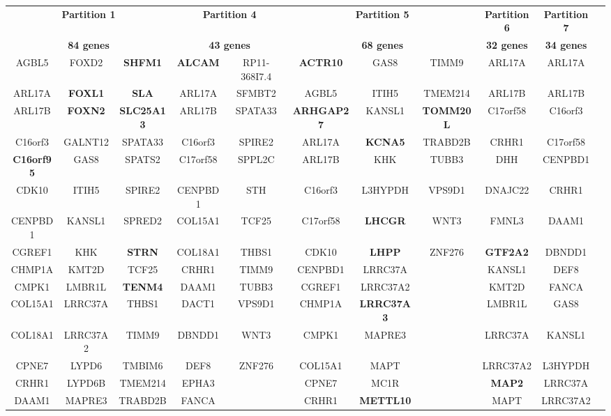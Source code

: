 \begin{adjustwidth}{-3 cm}{-3 cm}\centering\begin{threeparttable}[!htb]
	\tiny
	\begin{tabular}{ccc||cc||ccc||c||cc}\toprule
		\multicolumn{3}{c}{\textbf{Partition 1}} &\multicolumn{2}{c}{\textbf{Partition 4}} &\multicolumn{3}{c}{\textbf{Partition 5}} &\textbf{Partition 6} &\textbf{Partition 7} \\
		\multicolumn{3}{c}{\textbf{84 genes}} &\multicolumn{2}{c}{\textbf{43 genes}} &\multicolumn{3}{c}{\textbf{68 genes}} &\textbf{32 genes} &\textbf{34 genes}
		\\\midrule
		AGBL5 &FOXD2 &\textbf{SHFM1} &\textbf{ALCAM} &RP11-368I7.4 &\textbf{ACTR10} &GAS8 &TIMM9 &ARL17A &ARL17A \\
		ARL17A &\textbf{FOXL1} &\textbf{SLA} &ARL17A &SFMBT2 &AGBL5 &ITIH5 &TMEM214 &ARL17B &ARL17B \\
		ARL17B &\textbf{FOXN2} &\textbf{SLC25A13} &ARL17B &SPATA33 &\textbf{ARHGAP27} &KANSL1 &\textbf{TOMM20L} &C17orf58 &C16orf3 \\
		C16orf3 &GALNT12 &SPATA33 &C16orf3 &SPIRE2 &ARL17A &\textbf{KCNA5} &TRABD2B &CRHR1 &C17orf58 \\
		\textbf{C16orf95} &GAS8 &SPATS2 &C17orf58 &SPPL2C &ARL17B &KHK &TUBB3 &DHH &CENPBD1 \\
		CDK10 &ITIH5 &SPIRE2 &CENPBD1 &STH &C16orf3 &L3HYPDH &VPS9D1 &DNAJC22 &CRHR1 \\
		CENPBD1 &KANSL1 &SPRED2 &COL15A1 &TCF25 &C17orf58 &\textbf{LHCGR} &WNT3 &FMNL3 &DAAM1 \\
		CGREF1 &KHK &\textbf{STRN} &COL18A1 &THBS1 &CDK10 &\textbf{LHPP} &ZNF276 &\textbf{GTF2A2} &DBNDD1 \\
		CHMP1A &KMT2D &TCF25 &CRHR1 &TIMM9 &CENPBD1 &LRRC37A & &KANSL1 &DEF8 \\
		CMPK1 &LMBR1L &\textbf{TENM4} &DAAM1 &TUBB3 &CGREF1 &LRRC37A2 & &KMT2D &FANCA \\
		COL15A1 &LRRC37A &THBS1 &DACT1 &VPS9D1 &CHMP1A &\textbf{LRRC37A3} &\textbf{} &LMBR1L &GAS8 \\
		COL18A1 &LRRC37A2 &TIMM9 &DBNDD1 &WNT3 &CMPK1 &MAPRE3 & &LRRC37A &KANSL1 \\
		CPNE7 &LYPD6 &TMBIM6 &DEF8 &ZNF276 &COL15A1 &MAPT & &LRRC37A2 &L3HYPDH \\
		CRHR1 &LYPD6B &TMEM214 &EPHA3 & &CPNE7 &MC1R & &\textbf{MAP2} &LRRC37A \\
		DAAM1 &MAPRE3 &TRABD2B &FANCA & &CRHR1 &\textbf{METTL10} &\textbf{} &MAPT &LRRC37A2 \\

\end{tabular}
\end{threeparttable}
\end{adjustwidth}
